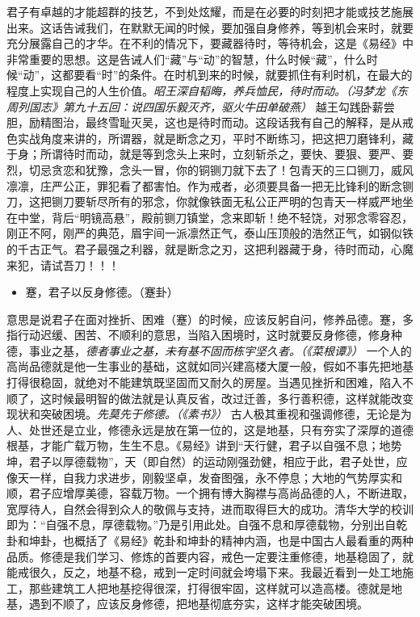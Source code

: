 君子有卓越的才能超群的技艺，不到处炫耀，而是在必要的时刻把才能或技艺施展出来。这话告诫我们，在默默无闻的时候，要加强自身修养，等到机会来时，就要充分展露自己的才华。在不利的情况下，要藏器待时，等待机会，这是《易经》中非常重要的思想。这是告诫人们“藏”与“动”的智慧，什么时候“藏”，什么时候“动”，这都要看“时”的条件。在时机到来的时候，就要抓住有利时机，在最大的程度上实现自己的人生价值。\textit{昭王深自韬晦，养兵恤民，待时而动。（冯梦龙《东周列国志》第九十五回：说四国乐毅灭齐，驱火牛田单破燕）} 越王勾践卧薪尝胆，励精图治，最终雪耻灭吴，这也是待时而动。这段话我有自己的解释，是从戒色实战角度来讲的，所谓器，就是断念之刃，平时不断练习，把这把刀磨锋利，藏于身；所谓待时而动，就是等到念头上来时，立刻斩杀之，要快、要狠、要严、要烈，切忌贪恋和犹豫，念头一冒，你的铜铡刀就下去了！包青天的三口铡刀，威风凛凛，庄严公正，罪犯看了都害怕。作为戒者，必须要具备一把无比锋利的断念铡刀，这把铡刀要斩尽所有的邪念，你就像铁面无私公正严明的包青天一样威严地坐在中堂，背后“明镜高悬”，殿前铡刀镇堂，念来即斩！绝不轻饶，对邪念零容忍，刚正不阿，刚严的典范，眉宇间一派凛然正气，泰山压顶般的浩然正气，如钢似铁的千古正气。君子最强之利器，就是断念之刃，这把利器藏于身，待时而动，心魔来犯，请试吾刀！！！

\begin{itemize}\it
    \item 蹇，君子以反身修德。（蹇卦）
\end{itemize}

意思是说君子在面对挫折、困难（蹇）的时候，应该反躬自问，修养品德。蹇，多指行动迟缓、困苦、不顺利的意思，当陷入困境时，这时就要反身修德，修身种德，事业之基，\textit{德者事业之基，未有基不固而栋宇坚久者。（《菜根谭》）} 一个人的高尚品德就是他一生事业的基础，这就如同兴建高楼大厦一般，假如不事先把地基打得很稳固，就绝对不能建筑既坚固而又耐久的房屋。当遇见挫折和困难，陷入不顺了，这时候最明智的做法就是认真反省，改过迁善，多行善积德，这样就能改变现状和突破困境。\textit{先莫先于修德。（《素书》）} 古人极其重视和强调修德，无论是为人、处世还是立业，修德永远是放在第一位的，这是地基，只有夯实了深厚的道德根基，才能广载万物，生生不息。《易经》讲到“天行健，君子以自强不息；地势坤，君子以厚德载物”，天（即自然）的运动刚强劲健，相应于此，君子处世，应像天一样，自我力求进步，刚毅坚卓，发奋图强，永不停息；大地的气势厚实和顺，君子应增厚美德，容载万物。一个拥有博大胸襟与高尚品德的人，不断进取，宽厚待人，自然会得到众人的敬佩与支持，进而取得巨大的成功。清华大学的校训即为：“自强不息，厚德载物。”乃是引用此处。自强不息和厚德载物，分别出自乾卦和坤卦，也概括了《易经》乾卦和坤卦的精神内涵，也是中国古人最看重的两种品质。修德是我们学习、修炼的首要内容，戒色一定要注重修德，地基稳固了，就能戒很久，反之，地基不稳，戒到一定时间就会垮塌下来。我最近看到一处工地施工，那些建筑工人把地基挖得很深，打得很牢固，这样就可以造高楼。德就是地基，遇到不顺了，应该反身修德，把地基彻底夯实，这样才能突破困境。

